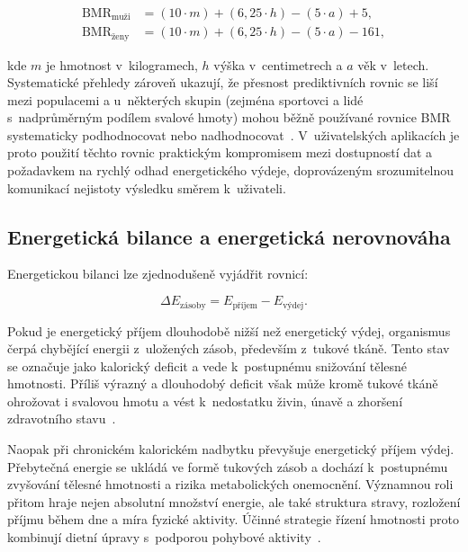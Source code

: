 \begin{align}
	\mathrm{BMR}_{\text{muži}} &= (10 \cdot m) + (6{,}25 \cdot h) - (5 \cdot a) + 5,   \label{eq:msj-muzi} \\
	\mathrm{BMR}_{\text{ženy}} &= (10 \cdot m) + (6{,}25 \cdot h) - (5 \cdot a) - 161, \label{eq:msj-zeny}
\end{align}

\noindent kde $m$ je hmotnost v~kilogramech, $h$ výška v~centimetrech a $a$ věk v~letech.
Systematické přehledy zároveň ukazují, že přesnost prediktivních rovnic se liší mezi populacemi a u~některých skupin (zejména sportovci a lidé s~nadprůměrným podílem svalové hmoty) mohou běžně používané rovnice BMR systematicky podhodnocovat nebo nadhodnocovat~\cite{frankenfield2005comparison}.
V~uživatelských aplikacích je proto použití těchto rovnic praktickým kompromisem mezi dostupností dat a požadavkem na rychlý odhad energetického výdeje, doprovázeným srozumitelnou komunikací nejistoty výsledku směrem k~uživateli.

\subsection{Energetická bilance a energetická nerovnováha}
\label{subsec:nerovnovaha}

Energetickou bilanci lze zjednodušeně vyjádřit rovnicí:

\begin{equation}
	\Delta E_{\text{zásoby}} = E_{\text{příjem}} - E_{\text{výdej}}.
	\label{eq:bilance}
\end{equation}

Pokud je energetický příjem dlouhodobě nižší než energetický výdej, organismus čerpá chybějící energii z~uložených zásob, především z~tukové tkáně.
Tento stav se označuje jako kalorický deficit a vede k~postupnému snižování tělesné hmotnosti.
Příliš výrazný a dlouhodobý deficit však může kromě tukové tkáně ohrožovat i svalovou hmotu a vést k~nedostatku živin, únavě a zhoršení zdravotního stavu~\cite{theodorakis2025humanEnergyBalance,drenowatz2025integrating}.

Naopak při chronickém kalorickém nadbytku převyšuje energetický příjem výdej.
Přebytečná energie se ukládá ve formě tukových zásob a dochází k~postupnému zvyšování tělesné hmotnosti a rizika metabolických onemocnění.
Významnou roli přitom hraje nejen absolutní množství energie, ale také struktura stravy, rozložení příjmu během dne a míra fyzické aktivity.
Účinné strategie řízení hmotnosti proto kombinují dietní úpravy s~podporou pohybové aktivity~\cite{drenowatz2025integrating}.

